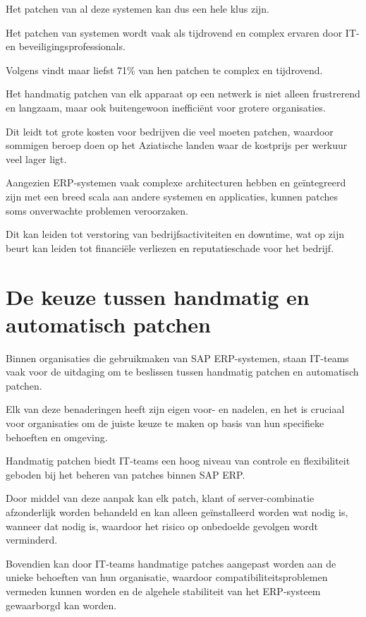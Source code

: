  Het patchen van al deze systemen kan dus een hele klus zijn.


Het patchen van systemen wordt vaak als tijdrovend en complex ervaren door IT- en beveiligingsprofessionals.

 Volgens \textcite{ivanti2021} vindt maar liefst 71\% van hen patchen te complex en tijdrovend.

 Het handmatig patchen van elk apparaat op een netwerk is niet alleen frustrerend en langzaam, maar ook buitengewoon inefficiënt voor grotere organisaties.

 Dit leidt tot grote kosten voor bedrijven die veel moeten patchen, waardoor sommigen beroep doen op het Aziatische landen waar de kostprijs per werkuur veel lager ligt.

 
Aangezien ERP-systemen vaak complexe architecturen hebben en geïntegreerd zijn met een breed scala aan andere systemen en applicaties, kunnen patches soms onverwachte problemen veroorzaken.

 Dit kan leiden tot verstoring van bedrijfsactiviteiten en downtime, wat op zijn beurt kan leiden tot financiële verliezen en reputatieschade voor het bedrijf.


	
\section{De keuze tussen handmatig en automatisch patchen}
Binnen organisaties die gebruikmaken van SAP ERP-systemen, staan IT-teams vaak voor de uitdaging om te beslissen tussen handmatig patchen en automatisch patchen.

 Elk van deze benaderingen heeft zijn eigen voor- en nadelen, en het is cruciaal voor organisaties om de juiste keuze te maken op basis van hun specifieke behoeften en omgeving.


Handmatig patchen biedt IT-teams een hoog niveau van controle en flexibiliteit geboden bij het beheren van patches binnen SAP ERP.

 Door middel van deze aanpak kan elk patch, klant of server-combinatie afzonderlijk worden behandeld en kan alleen geïnstalleerd worden wat nodig is, wanneer dat nodig is, waardoor het risico op onbedoelde gevolgen wordt verminderd.

 Bovendien kan door IT-teams handmatige patches aangepast worden aan de unieke behoeften van hun organisatie, waardoor compatibiliteitsproblemen vermeden kunnen worden en de algehele stabiliteit van het ERP-systeem gewaarborgd kan worden.

